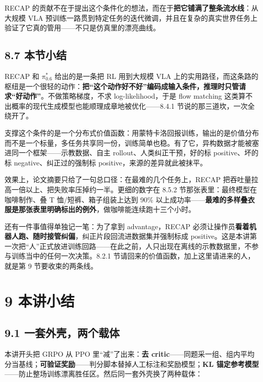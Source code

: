 \documentclass[
  chinese,
]{ctexart}
\begin{document}
RECAP
的贡献不在于提出这个条件化的想法，而在于\textbf{把它铺满了整条流水线}：从大规模
VLA
预训练一路贯到特定任务的迭代微调，并且在复杂的真实世界任务上验证了它真的管用------不只是仿真里的漂亮曲线。

\subsection{8.7 本节小结}\label{ux672cux8282ux5c0fux7ed3-7}

RECAP 和 \(\pi^{*}_{0.6}\) 给出的是一条把 RL 用到大规模 VLA
上的实用路径，而这条路的枢纽是一个很轻的动作：\textbf{把``这个动作好不好''编码成输入条件，推理时只管请求``好动作''}。不做策略梯度，不求
log-likelihood，于是 flow matching
这类算不出概率的现代生成模型也能顺理成章地被优化------8.4.1
节说的那三道坎，一次全绕开了。

支撑这个条件的是一个分布式价值函数：用蒙特卡洛回报训练，输出的是价值分布而不是一个标量，多任务共享同一份，训练简单也稳。有了它，异构数据才能被塞进同一个框架------示教数据、自主
rollout、人类纠正干预，好的标 positive、坏的标 negative、纠正过的强制标
positive，来源的差异就此被抹平。

效果上，论文摘要只给了一句总口径：在最难的几个任务上，RECAP
把吞吐量拉高一倍以上、把失败率压掉约一半。更细的数字在 8.5.2
节那张表里：最终模型在咖啡制作、叠 T 恤/短裤、箱子组装上达到 90\%
以上成功率------\textbf{最难的多样叠衣服是那张表里明确标出的例外}，做咖啡能连续跑十三个小时。

还有一件事值得单独记一笔：为了拿到 advantage，RECAP
必须让操作员\textbf{看着机器人跑、随时接管纠偏}，纠正片段回流进数据集并强制标成
positive。这是本讲第一次把``人''正式放进训练回路------在此之前，人只出现在离线的示教数据里，不参与训练当中的任何一次决策。8.2.1
节请回来的价值函数，加上这里请进来的人，就是第 9 节要收束的两条线。

\section{9 本讲小结}\label{ux672cux8bb2ux5c0fux7ed3}

\subsection{9.1
一套外壳，两个载体}\label{ux4e00ux5957ux5916ux58f3ux4e24ux4e2aux8f7dux4f53}

本讲开头把 GRPO 从 PPO 里``减''了出来：\textbf{去
critic}------同题采一组、组内平均分当基线；\textbf{可验证奖励}------判分脚本替掉人工标注和奖励模型；\textbf{KL
锚定参考模型}------防止整场训练漂离胜任区。然后同一套外壳换了两种载体：
\end{document}
